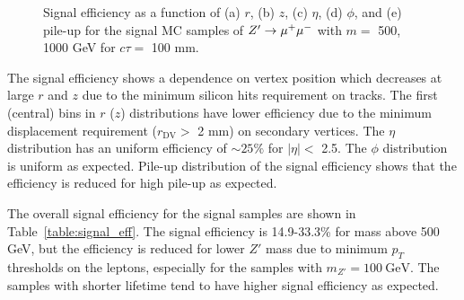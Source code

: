 \begin{figure}[!htb]
    \caption{Signal efficiency as a function of (a) $r$, (b) $z$, (c) $\eta$, (d) $\phi$, and (e) pile-up for the signal MC samples of $Z'\rightarrow \mu^{+}\mu^{-}$ with $m=$ 500, 1000 GeV for $c\tau=$ 100 mm.}
    \label{fig:signal_vertex_dist}
\end{figure}

The signal efficiency shows a dependence on vertex position which decreases at large $r$ and $z$ due to the minimum silicon hits requirement on tracks. The first (central) bins in $r$ ($z$) distributions have lower efficiency due to the minimum displacement requirement ($r_{\mathrm{DV}} > $ 2 mm) on secondary vertices. The $\eta$ distribution has an uniform efficiency of $\sim25\%$ for $|\eta|<$ 2.5. The $\phi$ distribution is uniform as expected. Pile-up distribution of the signal efficiency shows that the efficiency is reduced for high pile-up as expected.

The overall signal efficiency for the signal samples are shown in Table~\ref{table:signal_eff}. The signal efficiency is 14.9-33.3\% for mass above 500 GeV, but the efficiency is reduced for lower $Z'$ mass due to minimum $p_{T}$ thresholds on the leptons, especially for the samples with $m_{Z'}=100~\si{\GeV}$. The samples with shorter lifetime tend to have higher signal efficiency as expected. 

